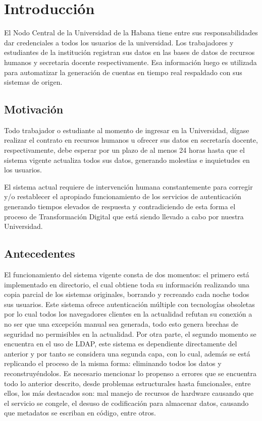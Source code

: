\chapter*{Introducción}\label{chapter:introduction}
El Nodo Central de la Universidad de la Habana tiene entre sus responsabilidades dar  credenciales  a todos los usuarios de la universidad. Los trabajadores y estudiantes de la instituci\'on registran sus datos en las bases de datos de recursos humanos y secretaria docente respectivamente. Esa informaci\'on luego es utilizada para automatizar la generación de cuentas en tiempo real respaldado con sus sistemas de origen.


\section*{Motivación}
Todo trabajador o estudiante al momento de ingresar en la Universidad, dígase realizar el contrato en recursos humanos u ofrecer sus datos en secretaría docente, respectivamente, debe esperar por un plazo de al menos 24 horas hasta que el sistema vigente actualiza todos sus datos, generando molestias e inquietudes en los usuarios.

El sistema actual requiere de intervención humana constantemente para corregir y/o restablecer el apropiado funcionamiento de los servicios de autenticación generando tiempos elevados de respuesta y contradiciendo de esta forma el proceso de Transformación Digital que está siendo llevado a cabo por nuestra Universidad.

\section*{Antecedentes}
El funcionamiento del sistema vigente consta de dos momentos: el primero está implementado en directorio, el cual obtiene toda su información realizando una copia parcial de los sistemas originales, borrando y recreando cada noche todos sus usuarios. Este sistema ofrece autenticación múltiple con tecnologías obsoletas por lo cual todos los navegadores clientes en la actualidad refutan su conexión a no ser que una excepción manual sea generada, todo esto genera brechas de seguridad no permisibles en la actualidad. Por otra parte, el segundo momento se encuentra en el uso de LDAP, este sistema es dependiente directamente del anterior y por tanto se considera una segunda capa, con lo cual, además se está replicando el proceso de la misma forma: eliminando todos los datos y reconstruyéndolos. Es necesario mencionar lo propenso a errores que se encuentra todo lo anterior descrito, desde problemas estructurales hasta funcionales, entre ellos, los más destacados son: mal manejo de recursos de hardware causando que el servicio se congele, el desuso de codificación para almacenar datos, causando que metadatos se escriban en código, entre otros.
